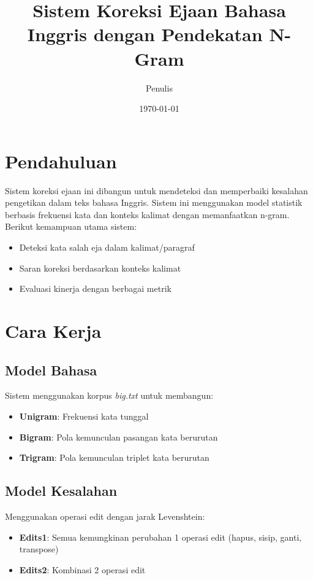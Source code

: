 \documentclass{article}
\title{Sistem Koreksi Ejaan Bahasa Inggris dengan Pendekatan N-Gram}
\author{Penulis}
\date{\today}
\begin{document}
\maketitle

\section{Pendahuluan}
Sistem koreksi ejaan ini dibangun untuk mendeteksi dan memperbaiki kesalahan pengetikan dalam teks bahasa Inggris. Sistem ini menggunakan model statistik berbasis frekuensi kata dan konteks kalimat dengan memanfaatkan n-gram. Berikut kemampuan utama sistem:

\begin{itemize}
    \item Deteksi kata salah eja dalam kalimat/paragraf
    \item Saran koreksi berdasarkan konteks kalimat
    \item Evaluasi kinerja dengan berbagai metrik
\end{itemize}

\section{Cara Kerja}
\subsection{Model Bahasa}
Sistem menggunakan korpus \textit{big.txt} untuk membangun:
\begin{itemize}
    \item \textbf{Unigram}: Frekuensi kata tunggal
    \item \textbf{Bigram}: Pola kemunculan pasangan kata berurutan
    \item \textbf{Trigram}: Pola kemunculan triplet kata berurutan
\end{itemize}

\subsection{Model Kesalahan}
Menggunakan operasi edit dengan jarak Levenshtein:
\begin{itemize}
    \item \textbf{Edits1}: Semua kemungkinan perubahan 1 operasi edit (hapus, sisip, ganti, transpose)
    \item \textbf{Edits2}: Kombinasi 2 operasi edit
\end{itemize}
\end{document}
